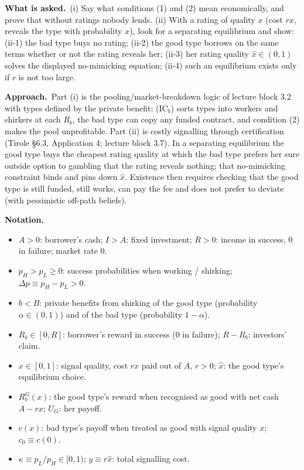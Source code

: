 \documentclass[11pt,a4paper]{article}
\newcommand{\notation}{\par\noindent\textbf{Notation.}}
\newcommand{\asked}{\par\medskip\noindent\textbf{What is asked.}~}
\newcommand{\approach}{\par\smallskip\noindent\textbf{Approach.}~}
\begin{document}
\asked (i) Say what conditions (1) and (2) mean economically, and prove that without ratings nobody lends. (ii) With a rating of quality $x$ (cost $rx$, reveals the type with probability $x$), look for a separating equilibrium and show: (ii-1) the bad type buys no rating; (ii-2) the good type borrows on the same terms whether or not the rating reveals her; (ii-3) her rating quality $\hat x\in(0,1)$ solves the displayed no-mimicking equation; (ii-4) such an equilibrium exists only if $r$ is not too large.

\approach Part (i) is the pooling/market-breakdown logic of lecture block 3.2 with types defined by the private benefit: (IC$_b$) sorts types into workers and shirkers at each $R_b$, the bad type can copy any funded contract, and condition (2) makes the pool unprofitable. Part (ii) is costly signalling through certification (Tirole \S6.3, Application 4; lecture block 3.7). In a separating equilibrium the good type buys the cheapest rating quality at which the bad type prefers her sure outside option to gambling that the rating reveals nothing; that no-mimicking constraint binds and pins down $\hat x$. Existence then requires checking that the good type is still funded, still works, can pay the fee and does not prefer to deviate (with pessimistic off-path beliefs).

\notation
\begin{itemize}
  \item $A>0$: borrower's cash; $I>A$: fixed investment; $R>0$: income in success, $0$ in failure; market rate $0$.
  \item $p_H>p_L\ge0$: success probabilities when working / shirking; $\Delta p\equiv p_H-p_L>0$.
  \item $b<B$: private benefits from shirking of the good type (probability $\alpha\in(0,1)$) and of the bad type (probability $1-\alpha$).
  \item $R_b\in[0,R]$: borrower's reward in success (0 in failure); $R-R_b$: investors' claim.
  \item $x\in[0,1]$: signal quality, cost $rx$ paid out of $A$, $r>0$; $\hat x$: the good type's equilibrium choice.
  \item $R_b^G(x)$: the good type's reward when recognised as good with net cash $A-rx$; $U_G$: her payoff.
  \item $c(x)$: bad type's payoff when treated as good with signal quality $x$; $c_0\equiv c(0)$.
  \item $\kappa\equiv p_L/p_H\in[0,1)$; $y\equiv r\hat x$: total signalling cost.
\end{itemize}
\end{document}
